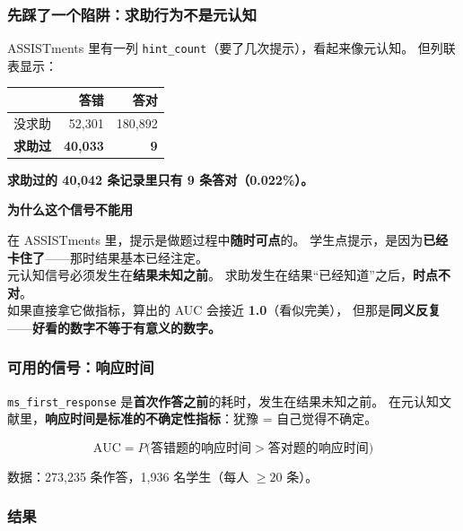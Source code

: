 \documentclass[UTF8,a4paper,11pt]{ctexart}
\newenvironment{explainbox}[1]
{\begin{center}\begin{minipage}{0.94\textwidth}\colorbox{boxbg}{\parbox{0.92\textwidth}{\textbf{#1}\par\vspace{2pt}}}}
{\end{minipage}\end{center}}
\begin{document}
\subsubsection{先踩了一个陷阱：求助行为不是元认知}

ASSISTments 里有一列 \texttt{hint\_count}（要了几次提示），看起来像元认知。
但列联表显示：

\begin{center}
\begin{tabular}{lrr}
\toprule
 & \textbf{答错} & \textbf{答对} \\
\midrule
没求助 & 52{,}301 & 180{,}892 \\
\textbf{求助过} & \textbf{40{,}033} & \textbf{9} \\
\bottomrule
\end{tabular}
\end{center}

\textbf{求助过的 40{,}042 条记录里只有 9 条答对（0.022\%）。}

\begin{explainbox}{为什么这个信号不能用}
在 ASSISTments 里，提示是做题过程中\textbf{随时可点}的。
学生点提示，是因为\textbf{已经卡住了}——那时结果基本已经注定。\\[4pt]
元认知信号必须发生在\textbf{结果未知之前}。
求助发生在结果“已经知道”之后，\textbf{时点不对}。\\[4pt]
如果直接拿它做指标，算出的 AUC 会接近 \textbf{1.0}（看似完美），
但那是\textbf{同义反复}——\textbf{好看的数字不等于有意义的数字。}
\end{explainbox}

\subsubsection{可用的信号：响应时间}

\texttt{ms\_first\_response} 是\textbf{首次作答之前}的耗时，发生在结果未知之前。
在元认知文献里，\textbf{响应时间是标准的不确定性指标}：犹豫 = 自己觉得不确定。

\begin{equation}
\text{AUC} = P\big(\text{答错题的响应时间} > \text{答对题的响应时间}\big)
\end{equation}

数据：273{,}235 条作答，1{,}936 名学生（每人 $\ge 20$ 条）。

\subsubsection{结果}
\end{document}

